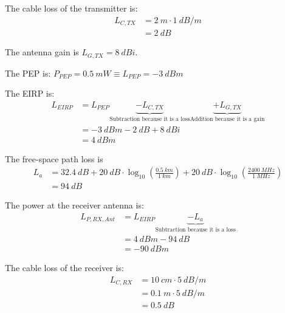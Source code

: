 \begin{solution}
\begin{tasks}
		\task
		The cable loss of the transmitter is:
		\begin{equation*}
			\begin{split}
				L_{C,TX} &= \SI{2}{m} \cdot \SI{1}{dB/m} \\
				 &= \SI{2}{dB}
			\end{split}
		\end{equation*}
	
		The antenna gain is $L_{G,TX} = \SI{8}{dBi}$.
	
		The PEP is: $P_{PEP} = \SI{0.5}{mW} \equiv L_{PEP} = \SI{-3}{dBm}$
		
		The EIRP is:
		\begin{equation*}
			\begin{split}
				L_{EIRP} &= L_{PEP} \underbrace{- L_{C,TX}}_{\text{Subtraction because it is a loss}} \underbrace{+ L_{G,TX}}_{\text{Addition because it is a gain}} \\
				 &= \SI{-3}{dBm} - \SI{2}{dB} + \SI{8}{dBi} \\
				 &= \SI{4}{dBm}
			\end{split}
		\end{equation*}
		
		\task
		The free-space path loss is
		\begin{equation*}
			\begin{split}
				L_a &= \SI{32.4}{dB} + \SI{20}{dB} \cdot \log_{10}\left(\frac{\SI{0.5}{km}}{\SI{1}{km}}\right) + \SI{20}{dB} \cdot \log_{10}\left(\frac{\SI{2400}{MHz}}{\SI{1}{MHz}}\right) \\
				&= \SI{94}{dB}
			\end{split}
		\end{equation*}
	
	
		The power at the receiver antenna is:
		\begin{equation*}
			\begin{split}
				L_{P,RX,Ant} &= L_{EIRP} \underbrace{- L_{a}}_{\text{Subtraction because it is a loss}} \\
				 &= \SI{4}{dBm} - \SI{94}{dB}\\
				 &= \SI{-90}{dBm}
			\end{split}
		\end{equation*}
	
		\task
		The cable loss of the receiver is:
		\begin{equation*}
			\begin{split}
				L_{C,RX} &= \SI{10}{cm} \cdot \SI{5}{dB/m} \\
				 &= \SI{0.1}{m} \cdot \SI{5}{dB/m} \\
				 &= \SI{0.5}{dB}
			\end{split}
		\end{equation*}
	

\end{tasks}
\end{solution}
